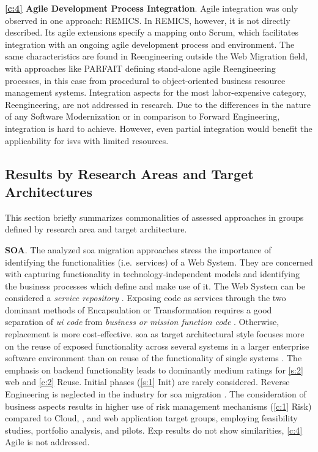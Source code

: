 \textbf{\cref{c:4} Agile Development Process Integration}. Agile integration was only observed in one approach: REMICS.
In REMICS, however, it is not directly described.
Its agile extensions specify a mapping onto Scrum, which facilitates integration with an ongoing agile development process and environment.
The same characteristics are found in \gls{Reengineering} outside the \gls{Web Migration} field, with approaches like PARFAIT \autocite{Cagnin2003} defining stand-alone agile \gls{Reengineering} processes, in this case from procedural to object-oriented business resource management systems.
Integration aspects for the most labor-expensive category, \gls{Reengineering}, are not addressed in research.
Due to the differences in the nature of any \gls{Software Modernization} or  in comparison to \gls{Forward Engineering}, integration is hard to achieve.
However, even partial integration would benefit the applicability for \glspl{isv} with limited resources.

\vspace{-10pt}
\hypertarget{sec:sota.discussion.targets}{%
\subsection[Results by Research Areas \& Target Architectures]{Results by Research Areas and Target Architectures}\label{sec:sota.discussion.targets}}
This section briefly summarizes commonalities of assessed approaches in groups defined by research area and target architecture.
\vspace{10pt}

\textbf{SOA}. The analyzed \gls{soa} migration approaches stress the importance of identifying the functionalities (i.e.~services) of a  \gls{Web System}.
They are concerned with capturing functionality in technology-independent models and identifying the business processes which define and make use of it.
The  \gls{Web System} can be considered a \emph{service repository} \autocite{Sosa2014MigraSOA}.
Exposing  code as services through the two dominant methods of \gls{Encapsulation} or \gls{Transformation} requires a good separation of \emph{\gls{ui} code} from \emph{business or mission function code} \autocite{Lewis2008SMART}. Otherwise, replacement is more cost-effective.
\gls{soa} as target architectural style focuses more on the reuse of exposed functionality across several systems in a larger enterprise software environment than on reuse of the functionality of single systems \autocite{Lewis2008SMART}.
The emphasis on backend functionality leads to dominantly medium ratings for \cref{s:2} \gls{web} and \cref{c:2} Reuse.
Initial phases (\cref{s:1} Init) are rarely considered.
\gls{Reverse Engineering} is neglected in the industry for \gls{soa} migration \autocite{Razavian2012}.
The consideration of business aspects results in higher use of \gls{risk management} mechanisms (\cref{c:1} Risk) compared to Cloud, , and \gls{web} application target groups, employing feasibility studies, portfolio analysis, and pilots.
 Exp results do not show similarities, \cref{c:4} Agile is not addressed.

